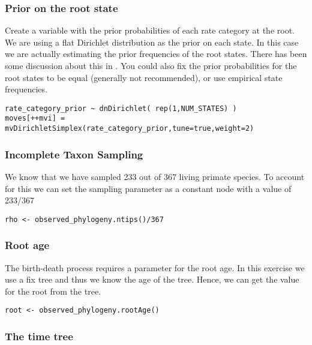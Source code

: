 \subsubsection{Prior on the root state}
Create a variable with the prior probabilities of each rate category at the root.
We are using a flat Dirichlet distribution as the prior on each state.
In this case we are actually estimating the prior frequencies of the root states.
There has been some discussion about this in \cite{FitzJohn2009}.
You could also fix the prior probabilities for the root states to be equal (generally not recommended), or use empirical state frequencies. 
{\tt \begin{snugshade*}
\begin{lstlisting}
rate_category_prior ~ dnDirichlet( rep(1,NUM_STATES) )
moves[++mvi] = mvDirichletSimplex(rate_category_prior,tune=true,weight=2)
\end{lstlisting}
\end{snugshade*}}

\subsubsection{Incomplete Taxon Sampling}

We know that we have sampled 233 out of 367 living primate species. 
To account for this we can set the sampling parameter as a constant node with a value of 233/367
{\tt \begin{snugshade*}
\begin{lstlisting}
rho <- observed_phylogeny.ntips()/367
\end{lstlisting}
\end{snugshade*}}


\subsubsection{Root age}

The birth-death process requires a parameter for the root age.
In this exercise we use a fix tree and thus we know the age of the tree.
Hence, we can get the value for the root from the \citet{MagnusonFord2012} tree.
{\tt \begin{snugshade*}
\begin{lstlisting}
root <- observed_phylogeny.rootAge()
\end{lstlisting}
\end{snugshade*}}

\subsubsection{The time tree}

